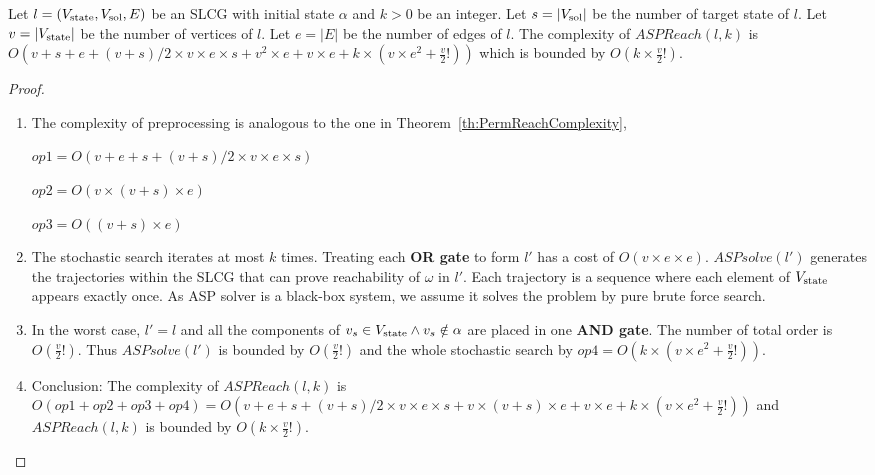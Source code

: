 \begin{theorem}\label{th:ASPReachComplexity}
    Let $l=(V_{\mathrm{state}},V_{\mathrm{sol}}, E)$ be an SLCG with initial state $\alpha$ and $k > 0$ be an integer.
    Let $s=|V_{\mathrm{sol}}|$ be the number of target state of $l$.
    Let $v = |V_{\mathrm{state}}|$ be the number of vertices of $l$.
    Let $e=|E|$ be the number of edges of $l$.
    The complexity of $ASPReach(l,k)$ is $O(v + s + e + (v+s) / 2 \times v \times e \times s + v^{2} \times e + v \times e + k \times (v \times e^{2} + \frac{v}{2}!))$ which is bounded by $O(k \times \frac{v}{2}!)$.
    \begin{proof}
    \begin{enumerate}
        \item The complexity of preprocessing is analogous to the one in Theorem~\ref{th:PermReachComplexity},
        
        $op1=O(v+ e + s + (v+s) / 2 \times v \times e \times s)$
        
        $op2=O(v \times (v+s) \times e)$
        
        $op3=O((v+s) \times e)$
        
        \item The stochastic search iterates at most $k$ times.
        Treating each \textbf{OR gate} to form $l'$ has a cost of $O(v \times e \times e)$.
        $ASPsolve(l')$ generates the trajectories within the SLCG that can prove reachability of $\omega$ in $l'$.
        Each trajectory is a sequence where each element of $V_{\mathrm{state}}$ appears exactly once.
        As ASP solver is a black-box system, we assume it solves the problem by pure brute force search.
        
        \item In the worst case, $l'=l$ and all the components of $v_s\in V_{\mathrm{state}}\land v_s\notin\alpha$ are placed in one \textbf{AND gate}.
        The number of total order is $O(\frac{v}{2}!)$.
        Thus $ASPsolve(l')$ is bounded by $O(\frac{v}{2}!)$ and the whole stochastic search by $op4=O(k \times (v \times e^{2} + \frac{v}{2}!))$.
        \item  Conclusion: The complexity of $ASPReach(l,k)$ is $O(op1 + op2 + op3 + op4) = O(v + e + s + (v+s) / 2  \times v \times e \times s + v \times (v+s) \times e + v \times e + k \times (v \times e^{2} + \frac{v}{2}!))$ and $ASPReach(l,k)$ is bounded by $O(k \times \frac{v}{2}!)$.
        \end{enumerate}
    \end{proof}
\end{theorem}



